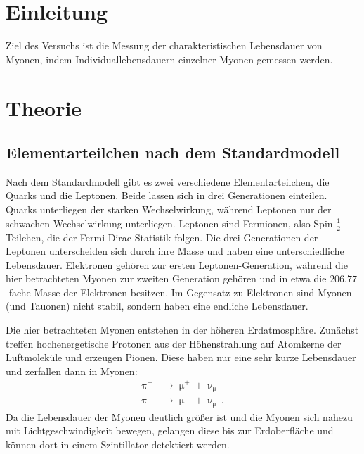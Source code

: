 \section{Einleitung}
Ziel des Versuchs ist die Messung der charakteristischen Lebensdauer von Myonen, indem Individuallebensdauern
einzelner Myonen gemessen werden.

\section{Theorie}
\subsection{Elementarteilchen nach dem Standardmodell}
\label{sec:1}
Nach dem Standardmodell gibt es zwei verschiedene Elementarteilchen, die Quarks und die Leptonen. Beide lassen sich in
drei Generationen einteilen. Quarks unterliegen der starken Wechselwirkung, während Leptonen nur der schwachen Wechselwirkung
unterliegen. Leptonen sind Fermionen, also Spin-$\frac{1}{2}$-Teilchen, die der Fermi-Dirac-Statistik folgen.
Die drei Generationen der Leptonen unterscheiden sich durch ihre Masse und haben eine unterschiedliche Lebensdauer.
Elektronen gehören zur ersten Leptonen-Generation, während die hier betrachteten Myonen zur zweiten Generation gehören und in etwa
die $\num{206.77}$-fache Masse der Elektronen besitzen. Im Gegensatz zu Elektronen sind Myonen (und Tauonen) nicht stabil, sondern
haben eine endliche Lebensdauer.

Die hier betrachteten Myonen entstehen in der höheren Erdatmosphäre. Zunächst treffen hochenergetische Protonen aus der Höhenstrahlung
auf Atomkerne der Luftmoleküle und erzeugen Pionen. Diese haben nur eine sehr kurze Lebensdauer und zerfallen dann in Myonen:
\begin{align*}
  \uppi^+ &\to \upmu^+ + \upnu_{\upmu} \\
  \uppi^- &\to \upmu^- + \bar{\upnu}_{\upmu}\,.
\end{align*}
Da die Lebensdauer der Myonen deutlich größer ist und die Myonen sich nahezu mit Lichtgeschwindigkeit bewegen, gelangen diese
bis zur Erdoberfläche und können dort in einem Szintillator detektiert werden.

